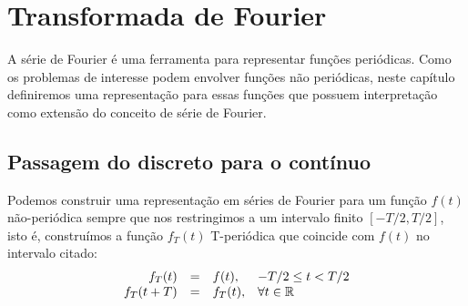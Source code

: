 %
\chapter{Transformada de Fourier}{\label{trans_Fourier}} %

A série de Fourier é uma ferramenta para representar funções periódicas. Como os problemas de interesse podem envolver fun\c{c}\~{o}es n\~{a}o peri\'{o}dicas, neste cap\'{i}tulo definiremos uma representa\c{c}\~{a}o para essas fun\c{c}\~{o}es que possuem interpreta\c{c}\~{a}o como extens\~{a}o do conceito de s\'{e}rie de Fourier.

\section{Passagem do discreto para o contínuo}
Podemos construir uma representação em séries de Fourier para um função $f(t)$ não-periódica sempre que nos restringimos a um intervalo finito $[-T/2,T/2]$, isto é, construímos a função $f_T(t)$ T-periódica que coincide com $f(t)$ no intervalo citado:
\begin{equation}{\label{T-period}}\begin{array}{rcll}
 f_T(t)&=&f(t),&-T/2\leq t<T/2\\
 f_T(t+T)&=&f_T(t),&\forall t\in \mathbb{R}
 \end{array}
\end{equation}
